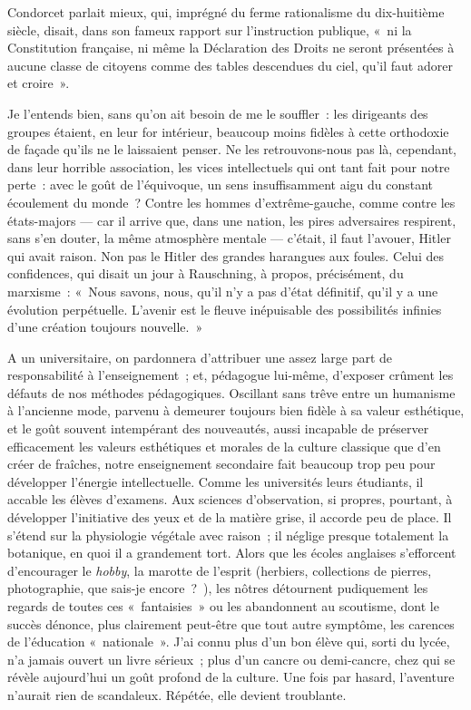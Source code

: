 \documentclass[french,twoside]{book} %
\begin{document}
Condorcet parlait mieux, qui, imprégné du ferme rationalisme du dix-huitième siècle, disait, dans son fameux rapport sur l’instruction publique, « ni la Constitution française, ni même la Déclaration des Droits ne seront présentées à aucune classe de   citoyens comme des tables descendues du ciel, qu’il faut adorer et croire ».\par
Je l’entends bien, sans qu’on ait besoin de me le souffler : les dirigeants des groupes étaient, en leur for intérieur, beaucoup moins fidèles à cette orthodoxie de façade qu’ils ne le laissaient penser. Ne les retrouvons-nous pas là, cependant, dans leur horrible association, les vices intellectuels qui ont tant fait pour notre perte : avec le goût de l’équivoque, un sens insuffisamment aigu du constant écoulement du monde ? Contre les hommes d’extrême-gauche, comme contre les états-majors — car il arrive que, dans une nation, les pires adversaires respirent, sans s’en douter, la même atmosphère mentale — c’était, il faut l’avouer, Hitler qui avait raison. Non pas le Hitler des grandes harangues aux foules. Celui des confidences, qui disait un jour à Rauschning, à propos, précisément, du marxisme : « Nous savons, nous, qu’il n’y a pas d’état définitif, qu’il y a une évolution perpétuelle. L’avenir est le fleuve inépuisable des possibilités infinies d’une création toujours nouvelle. »\par
A un universitaire, on pardonnera d’attribuer une assez large part de responsabilité à l’enseignement ; et, pédagogue lui-même, d’exposer crûment les défauts de nos méthodes pédagogiques. Oscillant sans trêve entre un humanisme à l’ancienne mode, parvenu à demeurer toujours bien fidèle à sa valeur esthétique, et le goût souvent intempérant des nouveautés, aussi incapable de préserver efficacement les valeurs esthétiques et morales de la culture classique que d’en créer de fraîches, notre enseignement secondaire fait beaucoup trop peu pour développer l’énergie intellectuelle. Comme les universités leurs étudiants, il accable les élèves d’examens. Aux sciences d’observation, si propres, pourtant, à développer l’initiative des yeux et de la matière grise, il accorde peu de place. Il s’étend sur la physiologie végétale avec raison ; il néglige presque totalement la   botanique, en quoi il a grandement tort. Alors que les écoles anglaises s’efforcent d’encourager le {\itshape hobby}, la marotte de l’esprit (herbiers, collections de pierres, photographie, que sais-je encore ? ), les nôtres détournent pudiquement les regards de toutes ces « fantaisies » ou les abandonnent au scoutisme, dont le succès dénonce, plus clairement peut-être que tout autre symptôme, les carences de l’éducation « nationale ». J’ai connu plus d’un bon élève qui, sorti du lycée, n’a jamais ouvert un livre sérieux ; plus d’un cancre ou demi-cancre, chez qui se révèle aujourd’hui un goût profond de la culture. Une fois par hasard, l’aventure n’aurait rien de scandaleux. Répétée, elle devient troublante.\par
\end{document}

